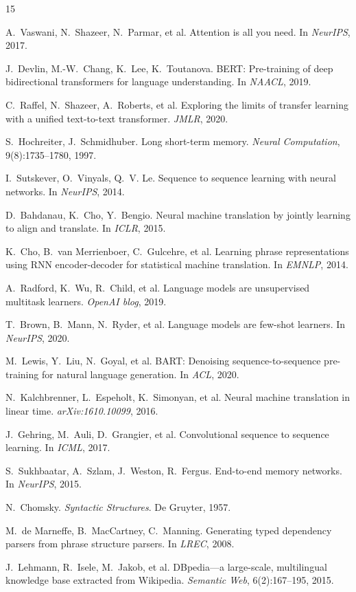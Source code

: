 \documentclass[10pt]{article}
\begin{document}
\begin{thebibliography}{15}

A.~Vaswani, N.~Shazeer, N.~Parmar, et al.
Attention is all you need.
In \emph{NeurIPS}, 2017.

J.~Devlin, M.-W.~Chang, K.~Lee, K.~Toutanova.
BERT: Pre-training of deep bidirectional transformers for language understanding.
In \emph{NAACL}, 2019.

C.~Raffel, N.~Shazeer, A.~Roberts, et al.
Exploring the limits of transfer learning with a unified text-to-text transformer.
\emph{JMLR}, 2020.

S.~Hochreiter, J.~Schmidhuber.
Long short-term memory.
\emph{Neural Computation}, 9(8):1735--1780, 1997.

I.~Sutskever, O.~Vinyals, Q.~V. Le.
Sequence to sequence learning with neural networks.
In \emph{NeurIPS}, 2014.

D.~Bahdanau, K.~Cho, Y.~Bengio.
Neural machine translation by jointly learning to align and translate.
In \emph{ICLR}, 2015.

K.~Cho, B.~van Merrienboer, C.~Gulcehre, et al.
Learning phrase representations using RNN encoder-decoder for statistical machine translation.
In \emph{EMNLP}, 2014.

A.~Radford, K.~Wu, R.~Child, et al.
Language models are unsupervised multitask learners.
\emph{OpenAI blog}, 2019.

T.~Brown, B.~Mann, N.~Ryder, et al.
Language models are few-shot learners.
In \emph{NeurIPS}, 2020.

M.~Lewis, Y.~Liu, N.~Goyal, et al.
BART: Denoising sequence-to-sequence pre-training for natural language generation.
In \emph{ACL}, 2020.

N.~Kalchbrenner, L.~Espeholt, K.~Simonyan, et al.
Neural machine translation in linear time.
\emph{arXiv:1610.10099}, 2016.

J.~Gehring, M.~Auli, D.~Grangier, et al.
Convolutional sequence to sequence learning.
In \emph{ICML}, 2017.

S.~Sukhbaatar, A.~Szlam, J.~Weston, R.~Fergus.
End-to-end memory networks.
In \emph{NeurIPS}, 2015.

N.~Chomsky.
\emph{Syntactic Structures}.
De Gruyter, 1957.

M.~de Marneffe, B.~MacCartney, C.~Manning.
Generating typed dependency parsers from phrase structure parsers.
In \emph{LREC}, 2008.

J.~Lehmann, R.~Isele, M.~Jakob, et al.
DBpedia---a large-scale, multilingual knowledge base extracted from Wikipedia.
\emph{Semantic Web}, 6(2):167--195, 2015.

\end{thebibliography}
\end{document}
